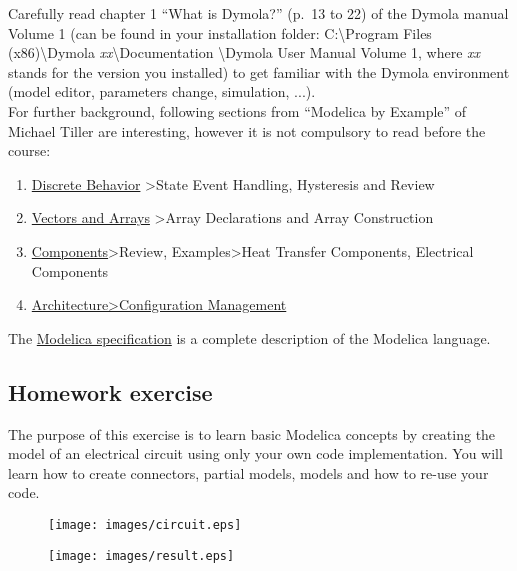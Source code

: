 \documentclass[10pt,a4paper]{article}
\begin{document}
Carefully read chapter 1 ``What is Dymola?'' (p.~13 to 22) of the Dymola manual 
Volume 1 (can be found in your installation folder: C:\textbackslash Program 
Files (x86)\textbackslash Dymola \textit{xx}\textbackslash Documentation 
\textbackslash Dymola User Manual Volume 1, where \textit{xx} stands for the 
version you installed) to get familiar with the Dymola environment (model 
editor, parameters change, simulation, ...).\\

For further background, following sections from ``Modelica by Example'' of 
Michael Tiller are interesting, however it is not compulsory to read before the 
course: 
\begin{enumerate}
\item \href{http://book.xogeny.com/behavior/discrete/}{Discrete Behavior} >State Event Handling, Hysteresis and Review
\item	\href{http://book.xogeny.com/behavior/arrays/}{Vectors and Arrays} >Array Declarations and Array Construction
\item	\href{http://book.xogeny.com/components/components/#review}{Components}>Review, Examples>Heat Transfer Components, Electrical Components
\item \href{http://book.xogeny.com/components/architectures/replaceable/}{Architecture>Configuration Management}
		
\end{enumerate}

The \href{https://www.modelica.org/documents/ModelicaSpec34.pdf}{Modelica specification} is a complete description of the Modelica language.


\subsection*{Homework exercise}
The purpose of this exercise is to learn basic Modelica concepts by creating the model of an electrical circuit 
using only your own code implementation. 
You will learn how to create connectors, partial models, 
models and how to re-use your code.

\begin{figure}[h]
	\centering
	\begin{minipage}{.4\textwidth}
		\centering
		\texttt{[image: images/circuit.eps]}
		\label{fig:cir}
	\end{minipage}%
	\begin{minipage}{.6\textwidth}
		\centering
		\texttt{[image: images/result.eps]}
		\label{fig:res}
	\end{minipage}
\end{figure}
\end{document}
